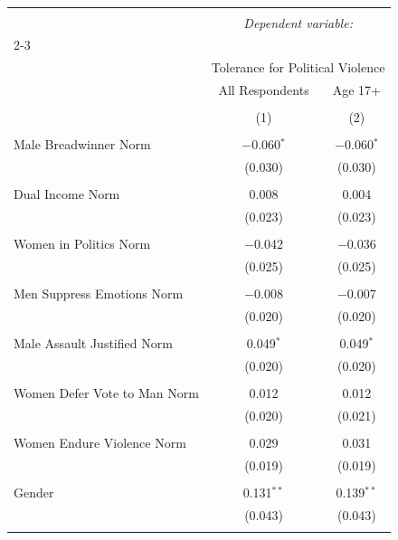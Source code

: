 
\begin{table}[!htbp] \centering 
  \caption{} 
  \label{} 
\begin{tabular}{@{\extracolsep{5pt}}lcc} 
\\[-1.8ex]\hline 
\hline \\[-1.8ex] 
 & \multicolumn{2}{c}{\textit{Dependent variable:}} \\ 
\cline{2-3} 
\\[-1.8ex] & \multicolumn{2}{c}{Tolerance for Political Violence} \\ 
 & All Respondents & Age 17+ \\ 
\\[-1.8ex] & (1) & (2)\\ 
\hline \\[-1.8ex] 
 Male Breadwinner Norm & $-$0.060$^{*}$ & $-$0.060$^{*}$ \\ 
  & (0.030) & (0.030) \\ 
  & & \\ 
 Dual Income Norm & 0.008 & 0.004 \\ 
  & (0.023) & (0.023) \\ 
  & & \\ 
 Women in Politics Norm & $-$0.042 & $-$0.036 \\ 
  & (0.025) & (0.025) \\ 
  & & \\ 
 Men Suppress Emotions Norm & $-$0.008 & $-$0.007 \\ 
  & (0.020) & (0.020) \\ 
  & & \\ 
 Male Assault Justified Norm & 0.049$^{*}$ & 0.049$^{*}$ \\ 
  & (0.020) & (0.020) \\ 
  & & \\ 
 Women Defer Vote to Man Norm & 0.012 & 0.012 \\ 
  & (0.020) & (0.021) \\ 
  & & \\ 
 Women Endure Violence Norm & 0.029 & 0.031 \\ 
  & (0.019) & (0.019) \\ 
  & & \\ 
 Gender & 0.131$^{**}$ & 0.139$^{**}$ \\ 
  & (0.043) & (0.043) \\ 
  & & \\ 

\end{tabular}
\end{table}
